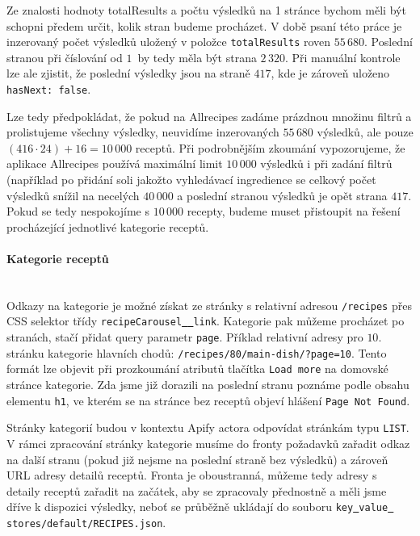 Ze znalosti hodnoty {totalResults} a počtu výsledků na 1 stránce bychom měli být schopni předem určit, kolik stran budeme procházet. V době psaní této práce je inzerovaný počet výsledků uložený v položce \texttt{totalResults} roven $55\,680$. Poslední stranou při číslování od $1$~by tedy měla být strana $2\,320$. Při manuální kontrole lze ale zjistit, že poslední výsledky jsou na straně $417$, kde je zároveň uloženo \texttt{hasNext:\,false}.

Lze tedy předpokládat, že pokud na Allrecipes zadáme prázdnou množinu filtrů a prolistujeme všechny výsledky, neuvidíme inzerovaných $55\,680$ výsledků, ale pouze $(416 \cdot 24) + 16 = 10\,000$ receptů. Při podrobnějším zkoumání vypozorujeme, že aplikace Allrecipes používá maximální limit $10\,000$ výsledků i při zadání filtrů (například po přidání soli jakožto vyhledávací ingredience se celkový počet výsledků snížil na necelých $40\,000$ a poslední stranou výsledků je opět strana $417$. Pokud se tedy nespokojíme s $10\,000$ recepty, budeme muset přistoupit na řešení procházející jednotlivé kategorie receptů.

\paragraph{Kategorie receptů}\mbox{}\\

Odkazy na kategorie je možné získat ze stránky s relativní adresou \texttt{/recipes} přes CSS selektor třídy \texttt{recipeCarousel\underline{{ }{ }}link}. Kategorie pak můžeme procházet po stranách, stačí přidat query parametr \texttt{page}. Příklad relativní adresy pro $10$. stránku kategorie hlavních chodů: \texttt{/recipes/80/main-dish/?page=10}. Tento formát lze objevit při prozkoumání atributů tlačítka \texttt{Load\,more} na domovské stránce kategorie. Zda jsme již dorazili na poslední stranu poznáme podle obsahu elementu \texttt{h1}, ve kterém se na stránce bez receptů objeví hlášení \texttt{Page\,Not\,Found}.

Stránky kategorií budou v kontextu Apify actora odpovídat stránkám typu \texttt{LIST}. V rámci zpracování stránky kategorie musíme do fronty požadavků zařadit odkaz na další stranu (pokud již nejsme na poslední straně bez výsledků) a zároveň URL adresy detailů receptů. Fronta je oboustranná, můžeme tedy adresy s detaily receptů zařadit na začátek, aby se zpracovaly přednostně a měli jsme dříve k dispozici výsledky, neboť se průběžně ukládají do souboru \texttt{key\underline{{ }}value\underline{{ }}stores/default/RECIPES.json}.

